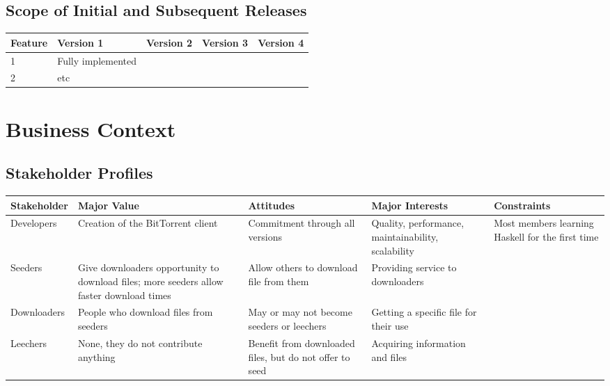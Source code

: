 \documentclass[letter]{scrartcl}
\begin{document}
\subsection{Scope of Initial and Subsequent Releases}
\begin{tabularx}{\textwidth}{| X | X | X | X | X |}
\hline
\textbf{Feature} & \textbf{Version 1} & \textbf{Version 2} & \textbf{Version 3} & \textbf{Version 4} \\
\hline
\hline
1 & Fully implemented & & & \\
\hline
2 & etc & & & \\
\hline
\end{tabularx}



\section{Business Context}
\subsection{Stakeholder Profiles}
\tabcolsep=0.11cm
\begin{tabularx}{\textwidth}{| X | X | X | X | X |}
\hline
\textbf{Stakeholder} & \textbf{Major Value} & \textbf{Attitudes} & \textbf{Major Interests} & \textbf{Constraints} \\
\hline
\hline
Developers & Creation of the BitTorrent client & Commitment through all versions & Quality, performance, maintainability, scalability & Most members learning Haskell for the first time \\
\hline
Seeders & Give downloaders opportunity to download files; more seeders allow faster download times & Allow others to download file from them & Providing service to downloaders &  \\ 
\hline
Downloaders & People who download files from seeders & May or may not become seeders or leechers & Getting a specific file for their use & \\
\hline
Leechers& None, they do not contribute anything & Benefit from downloaded files, but do not offer to seed & Acquiring information and files & \\
\hline
\end{tabularx}
\end{document}
